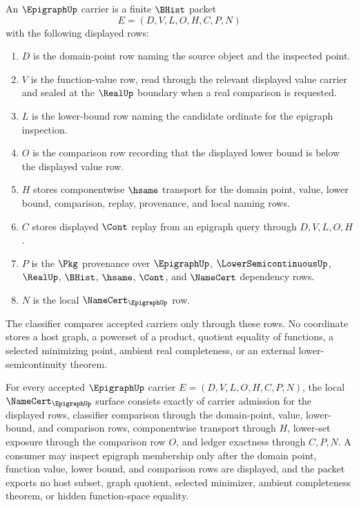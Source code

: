 \begin{definition}
\label{def:epigraph-carrier}
An $\EpigraphUp$ carrier is a finite $\BHist$ packet
$$
E=(D,V,L,O,H,C,P,N)
$$
with the following displayed rows:
\begin{enumerate}
\item $D$ is the domain-point row naming the source object and the inspected point.
\item $V$ is the function-value row, read through the relevant displayed value carrier and sealed at the $\RealUp$ boundary when a real comparison is requested.
\item $L$ is the lower-bound row naming the candidate ordinate for the epigraph inspection.
\item $O$ is the comparison row recording that the displayed lower bound is below the displayed value row.
\item $H$ stores componentwise $\hsame$ transport for the domain point, value, lower bound, comparison, replay, provenance, and local naming rows.
\item $C$ stores displayed $\Cont$ replay from an epigraph query through $D,V,L,O,H$.
\item $P$ is the $\Pkg$ provenance over $\EpigraphUp$, $\LowerSemicontinuousUp$, $\RealUp$, $\BHist$, $\hsame$, $\Cont$, and $\NameCert$ dependency rows.
\item $N$ is the local $\NameCert_{\EpigraphUp}$ row.
\end{enumerate}
The classifier compares accepted carriers only through these rows. No coordinate stores a host graph, a powerset of a product, quotient equality of functions, a selected minimizing point, ambient real completeness, or an external lower-semicontinuity theorem.
\end{definition}
\begin{theorem}
\label{thm:epigraph-namecert-obligations}
For every accepted $\EpigraphUp$ carrier $E=(D,V,L,O,H,C,P,N)$, the local $\NameCert_{\EpigraphUp}$ surface consists exactly of carrier admission for the displayed rows, classifier comparison through the domain-point, value, lower-bound, and comparison rows, componentwise transport through $H$, lower-set exposure through the comparison row $O$, and ledger exactness through $C,P,N$. A consumer may inspect epigraph membership only after the domain point, function value, lower bound, and comparison rows are displayed, and the packet exports no host subset, graph quotient, selected minimizer, ambient completeness theorem, or hidden function-space equality.
\end{theorem}
